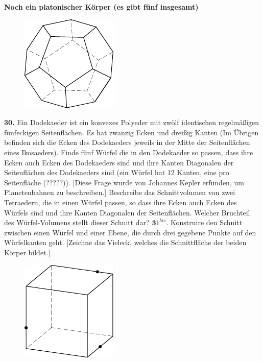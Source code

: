 \documentclass[12pt]{article} %
\begin{document}
{\bf Noch ein platonischer Körper (es gibt fünf insgesamt)}
\begin{figure}[h]
\centering
\includegraphics{taskbook-14}\\[2pt]
\end{figure}

\noindent
{\bf 30.} Ein Dodekaeder ist ein konvexes Polyeder mit zwölf identischen regelmäßigen fünfeckigen Seitenflächen. Es hat zwanzig Ecken und dreißig Kanten (Im Übrigen befinden sich die Ecken des Dodekaeders jeweils in der Mitte der Seitenflächen eines Ikosaeders).
Finde fünf Würfel die in den Dodekaeder so passen, dass ihre Ecken auch Ecken des Dodekaeders sind und ihre Kanten Diagonalen der Seitenflächen des Dodekaeders sind (ein Würfel hat 12 Kanten, eine pro Seitenfläche (?????)). [Diese Frage wurde von Johannes Kepler erfunden, um Planetenbahnen zu beschreiben.]
\bigskip
{} Beschreibe das Schnittvolumen von zwei Tetraedern, die in einen Würfel passen, so dass ihre Ecken auch Ecken des Würfels sind und ihre Kanten Diagonalen der Seitenflächen. 
Welcher Bruchteil des Würfel-Volumens stellt dieser Schnitt dar?
\newline\newline\quad
$\mathbf 31^{bis}.$ 
Konstruire den Schnitt zwischen einen Würfel und einer Ebene, die durch drei gegebene Punkte auf den Würfelkanten geht. [Zeichne das Vieleck, welches die Schnittfläche der beiden Körper bildet.]
\begin{figure}[h]
\centering
\includegraphics{taskbook-15}
\end{figure}
\end{document}
